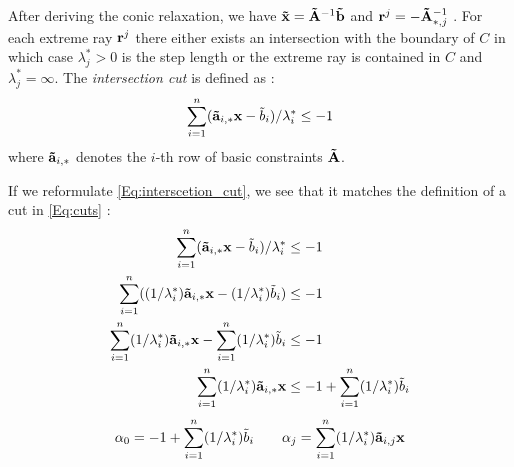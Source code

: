 After deriving the conic relaxation, we have $\bold{\tilde x} = \bold{\tilde A}^{-1} \bold{\tilde b}$ and $\bold r^j= - \bold{\tilde A}^{-1}_{*,j}$ \cite{bienstock_outer_product_free_sets}. For each extreme ray $\bold r^j$ there either exists an intersection with the boundary of $C$ in which case $\lambda^*_j > 0$ is the step length or the extreme ray is contained in $C$ and $\lambda^*_j= \infty$.
The \textit{intersection cut} is defined as \cite{bienstock_outer_product_free_sets}:
\begin{equation} \label{Eq:interscetion_cut}
    \sum_{i=1}^n (\bold{\tilde a}_{i,*} \bold x - \tilde b_i)/ \lambda_i^* \leq -1
\end{equation}
\quad where $\bold{\tilde a}_{i,*}$ denotes the $i$-th row of basic constraints $\bold{\tilde A}$.

If we reformulate \cref{Eq:interscetion_cut}, we see that it matches the definition of a cut in \cref{Eq:cuts} \cite{bienstock_outer_product_free_sets}:
\begin{align}
    \sum_{i=1}^n (\bold{\tilde a}_{i,*} \bold x - \tilde b_i)/ \lambda_i^* &\leq -1 \\
    \sum_{i=1}^n ((1/ \lambda_i^*) \bold{\tilde a}_{i,*} \bold x - (1/ \lambda_i^*)\tilde b_i) &\leq -1 \\ 
    \sum_{i=1}^n (1/ \lambda_i^*) \bold{\tilde a}_{i,*} \bold x - \sum_{i=1}^n  (1/ \lambda_i^*)\tilde b_i &\leq -1 \\
    \sum_{i=1}^n (1/ \lambda_i^*) \bold{\tilde a}_{i,*} \bold x & \leq -1 + \sum_{i=1}^n  (1/ \lambda_i^*)\tilde b_i
\end{align}
\begin{equation*}
    \alpha_0 = -1 + \sum_{i=1}^n  (1/ \lambda_i^*)\tilde b_i \quad \quad \alpha_j = \sum_{i=1}^n (1/ \lambda_i^*) \bold{\tilde a}_{i,j} \bold x
\end{equation*}



